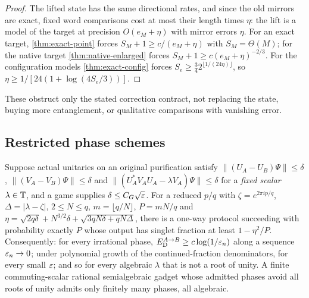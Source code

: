 \begin{proof}
The lifted state has the same directional rates, and since the old mirrors are exact, fixed word comparisons cost at most their
length times $\eta$: the lift is a model of the target at precision $O(e_M+\eta)$ with mirror errors $\eta$. For an exact target,
\cref{thm:exact-point} forces $S_M+1\ge c/(e_M+\eta)$ with $S_M=\Theta(M)$; for the native target \cref{thm:native-enlarged} forces
$S_M+1\ge c(e_M+\eta)^{-2/3}$. For the configuration models \cref{thm:exact-config} forces $S_e\ge\frac342^{\lfloor1/(24\eta)\rfloor}$, so
$\eta\ge1/[24(1+\log(4S_e/3))]$.
\end{proof}

These obstruct only the stated correction contract, not replacing the state, buying more entanglement, or qualitative
comparisons with vanishing error.

\subsection{Restricted phase schemes}\label{sec:phase}

\begin{proposition}\label{prop:phase}
Suppose actual unitaries on an original purification satisfy $\|(U_A-U_B)\Psi\|\le\delta$, $\|(V_A-V_B)\Psi\|\le\delta$ and
$\|(U_A^*V_AU_A-\lambda V_A)\Psi\|\le\delta$ for a \emph{fixed scalar} $\lambda\in\mathbb T$, and a game supplies $\delta\le C_G\sqrt{\varepsilon}$. For a reduced
$p/q$ with $\zeta=e^{2\pi ip/q}$, $\Delta=|\lambda-\zeta|$, $2\le N\le q$, $m=\lfloor q/N\rfloor$, $P=mN/q$ and
$\eta=\sqrt{2q\delta}+N^{3/2}\delta+\sqrt{3qN\delta+qN\Delta}$, there is a one-way protocol succeeding with probability exactly $P$ whose output
has singlet fraction at least $1-\eta^2/P$. Consequently: for every irrational phase, $E_{\mathrm D}^{A\to B}\ge c\log(1/\varepsilon_n)$ along a sequence
$\varepsilon_n\to0$; under polynomial growth of the continued-fraction denominators, for every small $\varepsilon$; and so for every algebraic
$\lambda$ that is not a root of unity. A finite commuting-scalar rational semialgebraic gadget whose admitted phases avoid all
roots of unity admits only finitely many phases, all algebraic.
\end{proposition}

